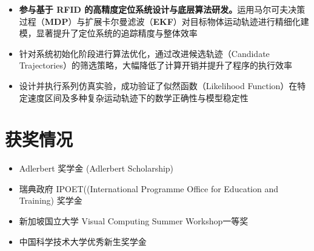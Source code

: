 \documentclass{resume}
\begin{document}
\begin{itemize}
  \item \textbf{参与基于 RFID 的高精度定位系统设计与底层算法研发。}运用马尔可夫决策过程（\textbf{MDP}）与扩展卡尔曼滤波（\textbf{EKF}）对目标物体运动轨迹进行精细化建模，显著提升了定位系统的追踪精度与整体效率
  \item 针对系统初始化阶段进行算法优化，通过改进候选轨迹（Candidate Trajectories）的筛选策略，大幅降低了计算开销并提升了程序的执行效率
  \item 设计并执行系列仿真实验，成功验证了似然函数（Likelihood Function）在特定速度区间及多种复杂运动轨迹下的数学正确性与模型稳定性
\end{itemize}

\vspace{1em}
\section{获奖情况}
\begin{itemize}[parsep=0.2ex]

\item [2026] Adlerbert 奖学金 (Adlerbert Scholarship)
\item [2024] 瑞典政府 IPOET((International Programme Office for Education and Training) 奖学金
\item [2023] 新加坡国立大学 Visual Computing Summer Workshop一等奖
\item [2020] 中国科学技术大学优秀新生奖学金

\end{itemize}


%
%
\end{document}
